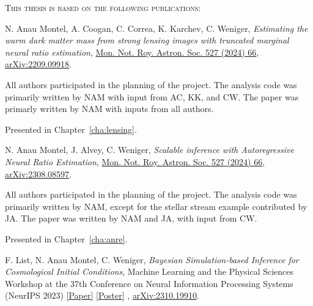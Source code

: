 
{\scshape This thesis is based on the following publications:} \vskip 14pt


\begin{itemize}[]

{\selectfont

\item [\cite{Montel:2022fhv}]

{N. Anau Montel}, A. Coogan, C. Correa, K. Karchev, C. Weniger, \textit{Estimating the warm dark matter mass from strong lensing images with truncated marginal neural ratio estimation}, 
\href{https://doi.org/10.1093/mnras/stad2925}{Mon. Not. Roy. Astron. Soc. 527 (2024) 66}, \href{https://arxiv.org/abs/2209.09918}{\ttfamily arXiv:2209.09918}. \vskip 4pt

{All authors participated in the planning of the project. The analysis code was primarily written by NAM with input from AC, KK, and CW. The paper was primarly written by NAM with inputs from all authors.}   \vskip 4pt

Presented in Chapter~\ref{cha:lensing}.\vskip 4pt
 

\item[\cite{AnauMontel:2023stj}] 
{N. Anau Montel}, J. Alvey, C. Weniger, \textit{Scalable inference with Autoregressive Neural Ratio Estimation}, \href{https://doi.org/10.1093/mnras/stae1130}{Mon. Not. Roy. Astron. Soc. 527 (2024) 66},  \href{https://arxiv.org/abs/2308.08597}{\ttfamily arXiv:2308.08597}.  \vskip 4pt

{All authors participated in the planning of the project. The analysis code was primarily written by NAM, except for the stellar stream example contributed by JA. The paper was written by NAM and JA, with input from CW.}   \vskip 4pt

Presented in Chapter~\ref{cha:anre}. \vskip 4pt


\item[\cite{List:2023aa}] 
F. List, {N. Anau Montel}, C. Weniger, \textit{Bayesian Simulation-based Inference for Cosmological Initial Conditions}, Machine Learning and the Physical Sciences Workshop at the 37th Conference on Neural Information Processing Systems (NeurIPS 2023) \href{https://ml4physicalsciences.github.io/2023/files/NeurIPS_ML4PS_2023_218.pdf}{[Paper]} \href{https://nips.cc/media/PosterPDFs/NeurIPS%202023/76248.png}{[Poster]} ,  \href{https://arxiv.org/abs/2310.19910}{\ttfamily arXiv:2310.19910}.  \vskip 4pt

}
\end{itemize}
